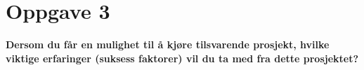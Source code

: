 \section{Oppgave 3}

{\bf Dersom du får en mulighet til å kjøre tilsvarende prosjekt, hvilke viktige
erfaringer (suksess faktorer) vil du ta med fra dette prosjektet?}